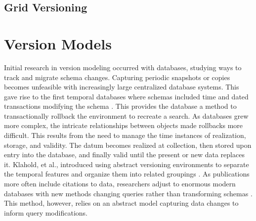 \subsection{Grid Versioning}

\section{Version Models} \label{sec:models}

Initial research in version modeling occurred with databases, studying ways to track and migrate schema changes.
Capturing periodic snapshots or copies becomes unfeasible with increasingly large centralized database systems.
This gave rise to the first temporal databases where schemas included time and dated transactions modifying the schema \cite{roddick1996model}.
This provides the database a method to transactionally rollback the environment to recreate a search.
As databases grew more complex, the intricate relationships between objects made rollbacks more difficult.
This results from the need to manage the time instances of realization, storage, and validity.
The datum becomes realized at collection, then stored upon entry into the database, and finally valid until the present or new data replaces it.
Klahold, et al., introduced using abstract versioning environments to separate the temporal features and organize them into related groupings \cite{Klahold:1986:GMV:645913.671314}.
As publications more often include citations to data, researchers adjust to enormous modern databases with new methods changing queries rather than transforming schemas \cite{Proell2013} \cite{DBLP:conf/data/2013}.
This method, however, relies on an abstract model capturing data changes to inform query modifications.

